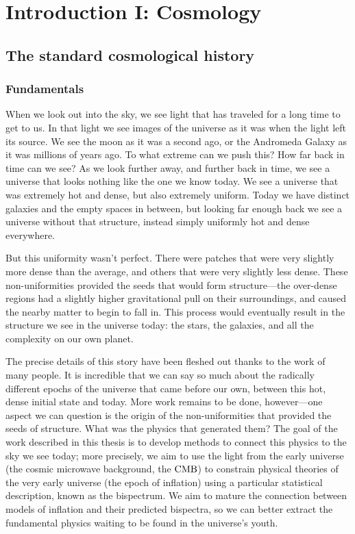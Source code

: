 %
\chapter{Introduction I: Cosmology}\label{chapter:intro_general}
\section{The standard cosmological history}\label{sec:general_intro}
    \subsection{Fundamentals}
When we look out into the sky, we see light that has traveled for a long time to get to us.
In that light we see images of the universe as it was when the light left its source.
We see the moon as it was a second ago, or the Andromeda Galaxy as it was millions of
years ago. To what extreme can we push this? How far back in time can we see? As we look further
away, and further back in time, we see a universe that looks nothing like the one we know today.
We see a universe that was extremely hot and dense, but also extremely uniform. Today
we have distinct galaxies and the empty spaces in between, but looking far enough back we see a universe
without that structure, instead simply uniformly hot and dense everywhere.


But this uniformity wasn't perfect. There were patches that were very slightly more dense than the average,
and others that were very slightly less dense. These non-uniformities provided the seeds that would form
structure---the over-dense regions had a slightly higher gravitational pull on their surroundings,
and caused the nearby matter to begin to fall in. This process would eventually result in the structure
we see in the universe today: the stars, the galaxies, and all the complexity on our own planet.


The precise details of this story have been fleshed out thanks to the work of many people.
It is incredible that we can say so much about the radically different epochs of the universe that came before our own,
between this hot, dense initial state and today.
More work remains to be done, however---one aspect we can question is the origin of the non-uniformities
that provided the seeds of structure. What was the physics that generated them?
The goal of the work described in this thesis is to develop methods to connect this physics
to the sky we see today; more precisely, we aim to use the light from the early universe (the cosmic microwave
background, the $\text{CMB}$)
to constrain physical theories of the very early universe (the epoch of inflation) using a particular
statistical description, known as the bispectrum.
We aim to mature the connection between models of inflation and their predicted bispectra, so we can better
extract the fundamental physics waiting to be found in the universe's youth.


